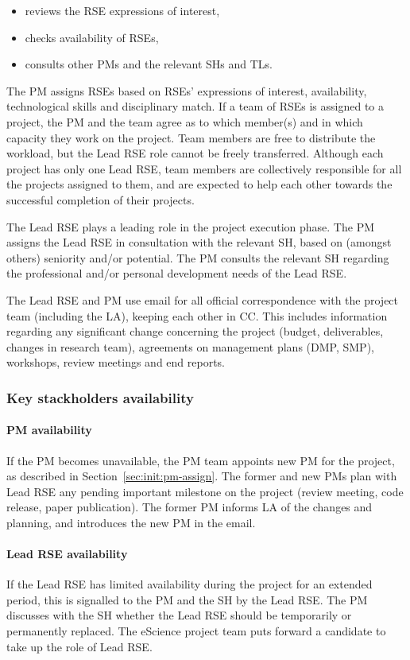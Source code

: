 \begin{itemize}
\item reviews the RSE expressions of interest,
\item checks availability of RSEs,
\item consults other PMs and the relevant SHs and TLs.
\end{itemize}

The PM assigns RSEs based on RSEs' expressions of interest, availability, technological skills and
disciplinary match. If a team of RSEs is assigned to a project, the PM and the team agree as to which member(s) and in
which capacity they work on the project. Team members are free to distribute the workload, but the Lead RSE role cannot
be freely transferred. Although each project has only one Lead RSE, team members are collectively responsible for all
the projects assigned to them, and are expected to help each other towards the successful completion of their
projects.

The Lead RSE plays a leading role in the project execution phase. The PM assigns the Lead RSE in consultation with the
relevant SH, based on (amongst others) seniority and/or potential. The PM consults the relevant SH regarding the
professional and/or personal development needs of the Lead RSE.

The Lead RSE and PM use email for all official correspondence with the project team (including the LA), keeping each
other in CC. This includes information regarding any significant change concerning the project (budget, deliverables,
changes in research team), agreements on management plans (DMP, SMP), workshops, review meetings and end reports.

\subsubsection{Key stackholders availability}
\paragraph{PM availability} If the PM becomes unavailable, the PM team appoints new PM for the project, as described in Section~\ref{sec:init:pm-assign}.
The former and new PMs plan with Lead RSE any pending important milestone on the project (review meeting, code release, paper publication).
The former PM informs LA of the changes and planning, and introduces the new PM in the email.

\paragraph{Lead RSE availability}
If the Lead RSE has limited availability during the project for an extended period, this is signalled to the PM and the
SH by the Lead RSE. The PM discusses with the SH whether the Lead RSE should be temporarily or permanently replaced.
The eScience project team puts forward a candidate to take up the role of Lead RSE.

